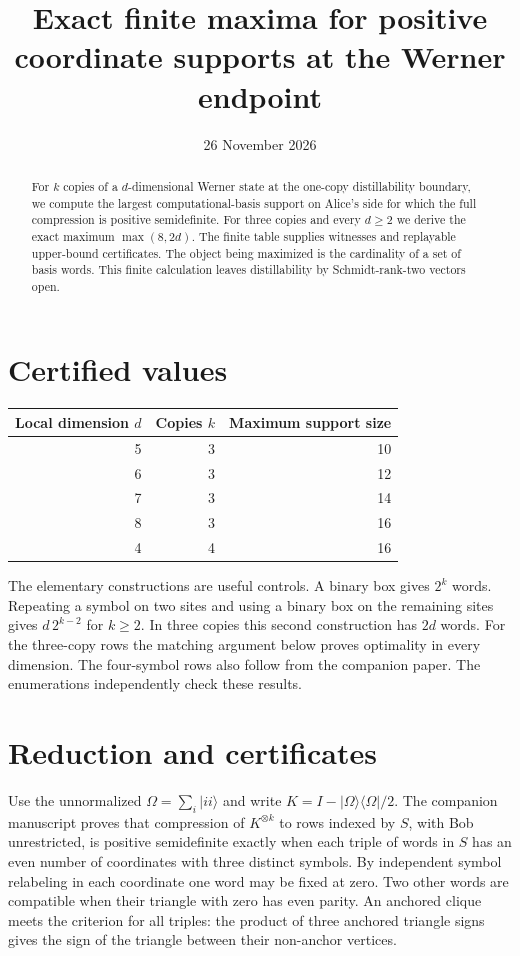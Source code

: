 \documentclass[11pt]{article}
\title{Exact finite maxima for positive coordinate supports at the Werner endpoint}
\date{26 November 2026}
\begin{document}
\maketitle
\begin{abstract}
For $k$ copies of a $d$-dimensional Werner state at the one-copy distillability boundary, we compute the largest computational-basis support on Alice's side for which the full compression is positive semidefinite. For three copies and every $d\ge2$ we derive the exact maximum $\max(8,2d)$. The finite table supplies witnesses and replayable upper-bound certificates. The object being maximized is the cardinality of a set of basis words. This finite calculation leaves distillability by Schmidt-rank-two vectors open.
\end{abstract}
\section*{Certified values}
\begin{center}
\begin{tabular}{rrr}
\toprule Local dimension $d$ & Copies $k$ & Maximum support size\\\midrule
5 & 3 & 10 \\
6 & 3 & 12 \\
7 & 3 & 14 \\
8 & 3 & 16 \\
4 & 4 & 16 \\
\bottomrule
\end{tabular}
\end{center}
The elementary constructions are useful controls. A binary box gives $2^k$ words. Repeating a symbol on two sites and using a binary box on the remaining sites gives $d\,2^{k-2}$ for $k\ge2$. In three copies this second construction has $2d$ words. For the three-copy rows the matching argument below proves optimality in every dimension. The four-symbol rows also follow from the companion paper. The enumerations independently check these results.
\section*{Reduction and certificates}
Use the unnormalized $\Omega=\sum_i |ii\rangle$ and write $K=I-|\Omega\rangle\langle\Omega|/2$. The companion manuscript proves that compression of $K^{\otimes k}$ to rows indexed by $S$, with Bob unrestricted, is positive semidefinite exactly when each triple of words in $S$ has an even number of coordinates with three distinct symbols. By independent symbol relabeling in each coordinate one word may be fixed at zero. Two other words are compatible when their triangle with zero has even parity. An anchored clique meets the criterion for all triples: the product of three anchored triangle signs gives the sign of the triangle between their non-anchor vertices.
\end{document}
